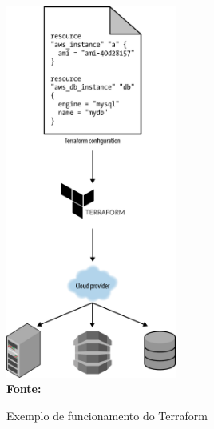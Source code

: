   \begin{figure}[ht]
	\centering	
	\caption[\hspace{0.1cm}Exemplo de funcionamento do Terraform]{Exemplo de funcionamento do Terraform}
	\vspace{-0.4cm}
	\includegraphics[width=0.5\textwidth]{figuras/terraform-working.png}
	 \vspace{-0.2cm}
	\\\textbf{\footnotesize Fonte: \cite{oreilly}}
	\label{fig:figura7}
\end{figure}
\vspace{-0.5cm}

 